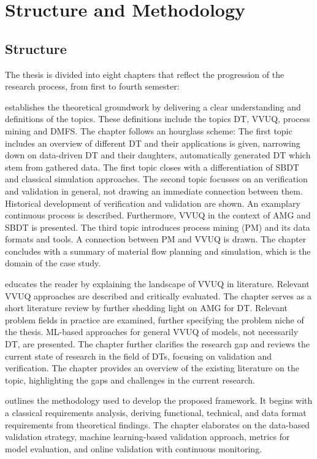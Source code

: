 \section{Structure and Methodology}

\subsection{Structure}

The thesis is divided into eight chapters that reflect the progression of the research process, from first to fourth semester:

 establishes the theoretical groundwork by delivering a clear understanding and definitions of the topics. These definitions include the topics DT, VVUQ, process mining and DMFS. The chapter follows an hourglass scheme: The first topic includes an overview of different DT and their applications is given, narrowing down on data-driven DT and their daughters, automatically generated DT which stem from gathered data. The first topic closes with a differentiation of SBDT and classical simulation approaches. The second topic focusses on an verification and validation in general, not drawing an immediate connection between them. Historical development of verification and validation are shown. An examplary continuous process is described. Furthermore, VVUQ in the context of AMG and SBDT is presented. The third topic introduces process mining (PM) and its data formats and tools. A connection between PM and VVUQ is drawn. The chapter concludes with a summary of material flow planning and simulation, which is the domain of the case study.

 educates the reader by explaining the landscape of VVUQ in literature. Relevant VVUQ approaches are described and critically evaluated. The chapter serves as a short literature review by further shedding light on AMG for DT. Relevant problem fields in practice are examined, further specifying the problem niche of the thesis. ML-based approaches for general VVUQ of models, not necessarily DT, are presented. The chapter further clarifies the research gap and reviews the current state of research in the field of DTs, focusing on validation and verification. The chapter provides an overview of the existing literature on the topic, highlighting the gaps and challenges in the current research.

 outlines the methodology used to develop the proposed framework. It begins with a classical requirements analysis, deriving functional, technical, and data format requirements from theoretical findings. The chapter elaborates on the data-based validation strategy, machine learning-based validation approach, metrics for model evaluation, and online validation with continuous monitoring.

